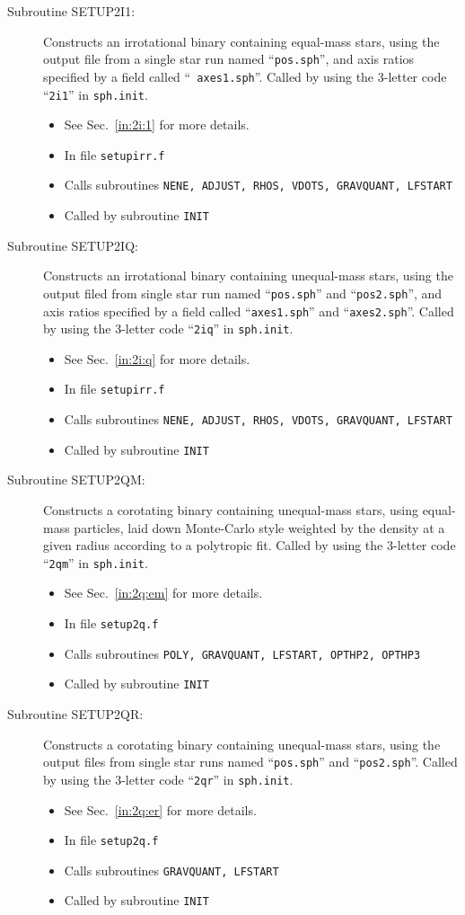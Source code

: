 \begin{description}
\item[Subroutine SETUP2I1:] Constructs an irrotational binary containing
equal-mass stars, using the output file from a single star run named
``{\tt pos.sph}'', and axis ratios specified by a field called ``{\tt
axes1.sph}''.  Called by using the 
3-letter code ``{\tt 2i1}'' in {\tt sph.init}. 
\begin{itemize} 
\item See Sec.~\ref{in:2i:1} for more details.
\item In file {\tt setupirr.f}
\item Calls subroutines {\tt NENE, ADJUST, RHOS, VDOTS, GRAVQUANT, LFSTART}
\item Called by subroutine {\tt INIT}
\end{itemize}

\item[Subroutine SETUP2IQ:] Constructs an irrotational binary containing
unequal-mass stars, using the output filed from single star run named
``{\tt pos.sph}'' and ``{\tt pos2.sph}'', 
and axis ratios specified by a field called ``{\tt axes1.sph}'' and
``{\tt axes2.sph}''.
Called by using the 3-letter code ``{\tt 2iq}'' in {\tt sph.init}. 
\begin{itemize} 
\item See Sec.~\ref{in:2i:q} for more details.
\item In file {\tt setupirr.f}
\item Calls subroutines {\tt NENE, ADJUST, RHOS, VDOTS, GRAVQUANT, LFSTART}
\item Called by subroutine {\tt INIT}
\end{itemize}

\item[Subroutine SETUP2QM:] Constructs a corotating binary containing
unequal-mass stars, using equal-mass
particles, laid down Monte-Carlo style weighted by the density at a
given radius according to a polytropic fit.  Called by using the
3-letter code ``{\tt 2qm}'' in {\tt sph.init}. 
\begin{itemize} 
\item See Sec.~\ref{in:2q:em} for more details.
\item In file {\tt setup2q.f}
\item Calls subroutines {\tt POLY, GRAVQUANT, LFSTART, OPTHP2, OPTHP3}
\item Called by subroutine {\tt INIT}
\end{itemize}

\item[Subroutine SETUP2QR:] Constructs a corotating binary containing
unequal-mass stars, using the output files from single star runs named
``{\tt pos.sph}'' and ``{\tt pos2.sph}''.  Called by using the
3-letter code ``{\tt 2qr}'' in {\tt sph.init}. 
\begin{itemize} 
\item See Sec.~\ref{in:2q:er} for more details.
\item In file {\tt setup2q.f}
\item Calls subroutines {\tt GRAVQUANT, LFSTART}
\item Called by subroutine {\tt INIT}
\end{itemize}


\end{description}

